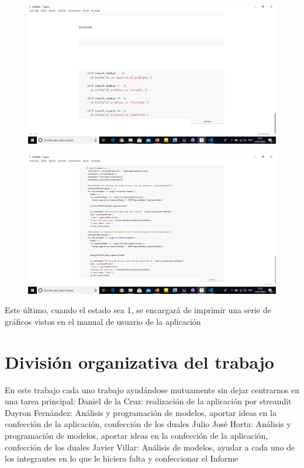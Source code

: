 \documentclass{llncs}
\begin{document}
\begin{figure}
	\centering
	\includegraphics[width=0.7\linewidth]{Imagenes/Codigo-Aplicacion/5}
	\label{fig:5}
\end{figure}
\begin{figure}
	\centering
	\includegraphics[width=0.7\linewidth]{Imagenes/Codigo-Aplicacion/6}
	\label{fig:6}
\end{figure}

Este último, cuando el estado sea 1, se encargará de imprimir una serie de gráficos vistos en el manual de usuario de la aplicación


\newpage
\section{División organizativa del trabajo}
En este trabajo cada uno trabajo ayudándose mutuamente sin dejar centrarnos en una tarea principal:
\newline
\newline
Daniel de la Cruz: realización de la aplicación por streamlit
\newline
\newline
Dayron Fernández: Análisis y programación de modelos, aportar ideas en la confección de la aplicación, confección de los duales
\newline
\newline
Julio José Horta: Análisis y programación de modelos, aportar ideas en la confección de la aplicación, confección de los duales
\newline
\newline
Javier Villar: Análisis de modelos, ayudar a cada uno de los integrantes en lo que le hiciera falta y confeccionar el Informe
\end{document}
